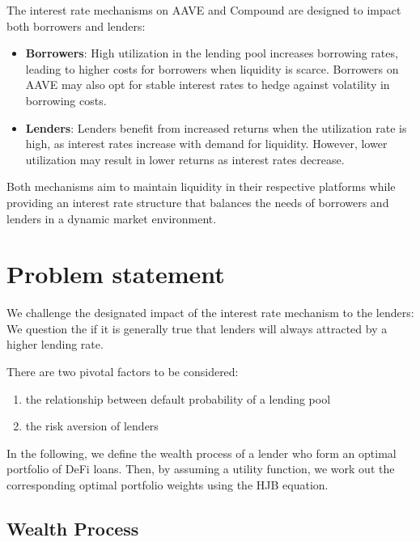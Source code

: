 \documentclass{article} %
\theoremstyle{plain}
\theoremstyle{definition} %
\begin{document}
The interest rate mechanisms on AAVE and Compound are designed to impact both borrowers and lenders:
\begin{itemize}
    \item \textbf{Borrowers}: High utilization in the lending pool increases borrowing rates, leading to higher costs for borrowers when liquidity is scarce. Borrowers on AAVE may also opt for stable interest rates to hedge against volatility in borrowing costs.
    \item \textbf{Lenders}: Lenders benefit from increased returns when the utilization rate is high,
     as interest rates increase with demand for liquidity. 
    However, lower utilization may result in lower returns as interest rates decrease.
\end{itemize}

Both mechanisms aim to maintain liquidity in their respective platforms while providing an interest rate structure that balances the needs of borrowers and lenders in a dynamic market environment.


\section{Problem statement}
We challenge the designated impact of the interest rate mechanism to the lenders: 
We question the if it is generally true that lenders will always attracted by a higher lending rate. 

There are two pivotal factors to be considered:
\begin{enumerate}
  \item the relationship between default probability of a lending pool
  \item the risk aversion of lenders
 \end{enumerate}

In the following, we define the wealth process of a lender who form an optimal portfolio of DeFi loans. 
Then, by assuming a utility function, we work out the corresponding optimal portfolio weights using the HJB equation.

\subsection{Wealth Process}
\end{document}
